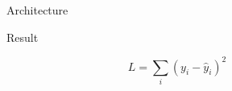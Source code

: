 \begin{figure}[h]\caption{Architecture}\label{fig:arch}\end{figure}
\begin{figure}[h]\caption{Result}\label{fig:result}\end{figure}
\begin{table}[h]\caption{Confusion}\label{tab:conf}\end{table}
\begin{equation}\label{eq:loss} L = \sum_i (y_i - \hat y_i)^2 \end{equation}